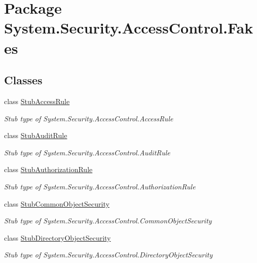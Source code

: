 \hypertarget{namespace_system_1_1_security_1_1_access_control_1_1_fakes}{\section{Package System.\-Security.\-Access\-Control.\-Fakes}
\label{namespace_system_1_1_security_1_1_access_control_1_1_fakes}
}
\subsection*{Classes}
\begin{DoxyCompactItemize}
\item 
class \hyperlink{class_system_1_1_security_1_1_access_control_1_1_fakes_1_1_stub_access_rule}{Stub\-Access\-Rule}
\begin{DoxyCompactList}\small\item\em Stub type of System.\-Security.\-Access\-Control.\-Access\-Rule\end{DoxyCompactList}\item 
class \hyperlink{class_system_1_1_security_1_1_access_control_1_1_fakes_1_1_stub_audit_rule}{Stub\-Audit\-Rule}
\begin{DoxyCompactList}\small\item\em Stub type of System.\-Security.\-Access\-Control.\-Audit\-Rule\end{DoxyCompactList}\item 
class \hyperlink{class_system_1_1_security_1_1_access_control_1_1_fakes_1_1_stub_authorization_rule}{Stub\-Authorization\-Rule}
\begin{DoxyCompactList}\small\item\em Stub type of System.\-Security.\-Access\-Control.\-Authorization\-Rule\end{DoxyCompactList}\item 
class \hyperlink{class_system_1_1_security_1_1_access_control_1_1_fakes_1_1_stub_common_object_security}{Stub\-Common\-Object\-Security}
\begin{DoxyCompactList}\small\item\em Stub type of System.\-Security.\-Access\-Control.\-Common\-Object\-Security\end{DoxyCompactList}\item 
class \hyperlink{class_system_1_1_security_1_1_access_control_1_1_fakes_1_1_stub_directory_object_security}{Stub\-Directory\-Object\-Security}
\begin{DoxyCompactList}\small\item\em Stub type of System.\-Security.\-Access\-Control.\-Directory\-Object\-Security\end{DoxyCompactList}\item 

\end{DoxyCompactItemize}
